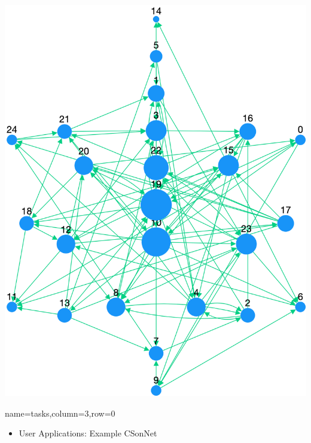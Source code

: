 \documentclass[landscape,paperwidth=70in,paperheight=46in,fontscale=0.225]{baposter} %
\begin{document}
\begin{poster}
{\begin{center}
\includegraphics[scale=0.12]{figures/gnm-25-100_pngraph.png} 
\end{center}
}

          {name=tasks,column=3,row=0}{


\begin{itemize}[leftmargin=*,noitemsep,topsep=0pt]
\item User Applications:  Example CSonNet
\end{itemize}

}
\end{poster}
\end{document}
